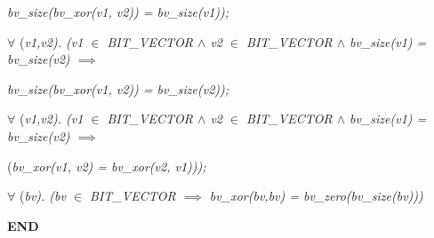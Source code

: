 \begin{sloppypar}
\hspace*{0.60in}\it bv\_size\rm (\it bv\_xor\rm (\it v1\rm , \it v2\rm )\rm ) \rm = \it bv\_size\rm (\it v1\rm )\rm )\rm ;

\hspace*{0.20in} $\forall$  \rm (\it v1\rm ,\it v2\rm )\rm . \rm (\it v1  $\in$  \it BIT\_VECTOR  $\land$  \it v2  $\in$  \it BIT\_VECTOR  $\land$  \it bv\_size\rm (\it v1\rm ) \rm = \it bv\_size\rm (\it v2\rm )  $\implies$  

\hspace*{0.60in}\it bv\_size\rm (\it bv\_xor\rm (\it v1\rm , \it v2\rm )\rm ) \rm = \it bv\_size\rm (\it v2\rm )\rm )\rm ;

\hspace*{0.20in} $\forall$  \rm (\it v1\rm ,\it v2\rm )\rm . \rm (\it v1  $\in$  \it BIT\_VECTOR  $\land$  \it v2  $\in$  \it BIT\_VECTOR  $\land$  \it bv\_size\rm (\it v1\rm ) \rm = \it bv\_size\rm (\it v2\rm )  $\implies$  

\hspace*{0.60in}\rm (\it bv\_xor\rm (\it v1\rm , \it v2\rm ) \rm = \it bv\_xor\rm (\it v2\rm , \it v1\rm )\rm )\rm )\rm ;

\hspace*{0.20in} $\forall$  \rm (\it bv\rm )\rm . \rm (\it bv  $\in$  \it BIT\_VECTOR  $\implies$  \it bv\_xor\rm (\it bv\rm ,\it bv\rm ) \rm = \it bv\_zero\rm (\it bv\_size\rm (\it bv\rm )\rm )\rm )

\bf END\newpage
\end{sloppypar}
